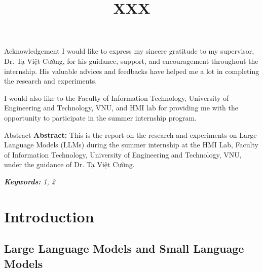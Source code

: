 \documentclass{uetgraduation}
\begin{document}
\title{XXX}

\makeenglishcovers


    

\begin{preamble}{Acknowledgement}
    I would like to express my sincere gratitude to my supervisor, Dr. Tạ Việt Cường, for his guidance, support, and encouragement throughout the internship. His valuable advices and feedbacks have helped me a lot in completing the research and experiments. \par
    I would also like to the Faculty of Information Technology, University of Engineering and Technology, VNU, and HMI lab for providing me with the opportunity to participate in the summer internship program. \par
\end{preamble}


\begin{preamble}{Abstract}
    \textbf{Abstract:}
    This is the report on the research and experiments on Large Language Models (LLMs) during the summer internship at the HMI Lab, Faculty of Information Technology, University of Engineering and Technology, VNU, under the guidance of Dr. Tạ Việt Cường. \par
    \textit{\textbf{Keywords:} 1, 2}
\end{preamble}

\chapter{Introduction}
\section{Large Language Models and Small Language Models}
\end{document}
